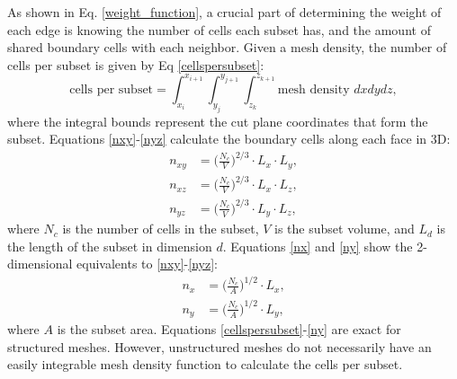 \documentclass[times,final]{elsarticle}
\begin{document}
As shown in Eq. \ref{weight_function}, a crucial part of determining the weight of each edge is knowing the number of cells each subset has, and the amount of shared boundary cells with each neighbor. Given a mesh density, the number of cells per subset is given by Eq \ref{cellspersubset}:
\begin{equation}
   \text{cells per subset} = \int_{x_i}^{x_{i+1}} \int_{y_j}^{y_{j+1}} \int_{z_k}^{z_{k+1}} \text{mesh density } dx dy dz,
\label{cellspersubset}
\end{equation}
where the integral bounds represent the cut plane coordinates that form the subset.
Equations \ref{nxy}-\ref{nyz} calculate the boundary cells along each face in 3D:
\begin{align}
n_{xy} &= \Big(\frac{N_c}{V}\Big)^{2/3}\cdot L_x\cdot L_y \label{nxy}, \\
n_{xz} &= \Big(\frac{N_c}{V}\Big)^{2/3}\cdot L_x\cdot L_z \label{nxz}, \\
n_{yz} &= \Big(\frac{N_c}{V}\Big)^{2/3}\cdot L_y\cdot L_z \label{nyz},
\end{align}
where $N_c$ is the number of cells in the subset, $V$ is the subset volume, and $L_d$ is the length of the subset in dimension $d$.
Equations \ref{nx} and \ref{ny} show the 2-dimensional equivalents to \ref{nxy}-\ref{nyz}:
\begin{align}
n_x &= \Big(\frac{N_c}{A}\Big)^{1/2}\cdot L_x, \label{nx} \\
n_y &= \Big(\frac{N_c}{A}\Big)^{1/2}\cdot L_y, \label{ny}
\end{align}
where $A$ is the subset area. Equations \ref{cellspersubset}-\ref{ny} are exact for structured meshes.
However, unstructured meshes do not necessarily have an easily integrable mesh density function to calculate the cells per subset.
\end{document}
